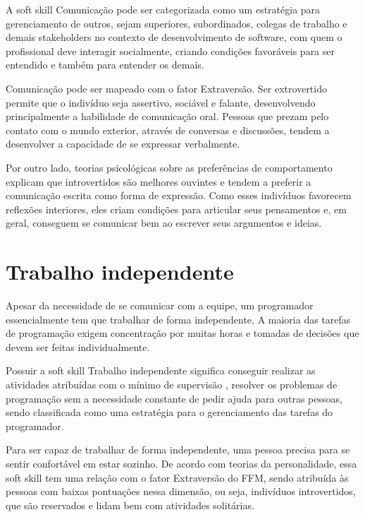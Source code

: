 A soft skill Comunicação pode ser categorizada como um estratégia para gerenciamento de outros, sejam superiores, subordinados, colegas de trabalho e demais stakeholders no contexto de desenvolvimento de software, com quem o profissional deve interagir socialmente, criando condições favoráveis para ser entendido e também para entender os demais.

Comunicação pode ser mapeado com o fator Extraversão. Ser extrovertido permite que o indivíduo seja assertivo, sociável e falante, desenvolvendo principalmente a habilidade de comunicação oral. Pessoas que prezam pelo contato com o mundo exterior, através de conversas e discussões, tendem a desenvolver a capacidade de se expressar verbalmente.

Por outro lado, teorias psicológicas sobre as preferências de comportamento \cite{myers:98} explicam que introvertidos são melhores ouvintes e tendem a preferir a comunicação escrita como forma de expressão. Como esses indivíduos favorecem reflexões interiores, eles criam condições para articular seus pensamentos e, em geral, conseguem se comunicar bem ao escrever seus argumentos e ideias.

\section{Trabalho independente}

Apesar da necessidade de se comunicar com a equipe, um programador essencialmente tem que trabalhar de forma independente. A maioria das tarefas de programação exigem concentração por muitas horas e tomadas de decisões que devem ser feitas individualmente.

Possuir a soft skill Trabalho independente significa conseguir realizar as atividades atribuídas com o mínimo de supervisão \cite{ahmed:12}, resolver os problemas de programação sem a necessidade constante de pedir ajuda para outras pessoas, sendo classificada como uma estratégia para o gerenciamento das tarefas do programador.

Para ser capaz de trabalhar de forma independente, uma pessoa precisa para se sentir confortável em estar sozinho. De acordo com teorias da personalidade, essa soft skill tem uma relação com o fator Extraversão do FFM\cite{rehman:12}, sendo atribuída às pessoas com baixas pontuações nessa dimensão, ou seja, indivíduos introvertidos, que são reservados e lidam bem com atividades solitárias.

